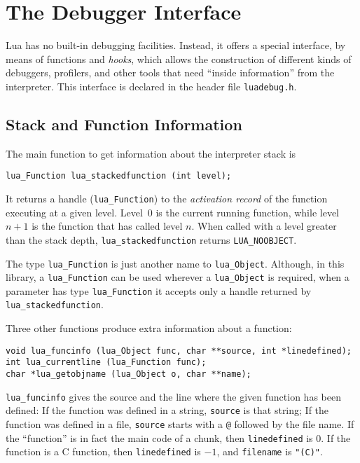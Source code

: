 \documentclass[11pt]{article}
\newcommand{\Math}[1]{$#1$}
\begin{document}
\section{The Debugger Interface} \label{debugI}

Lua has no built-in debugging facilities.
Instead, it offers a special interface,
by means of functions and \emph{hooks},
which allows the construction of different
kinds of debuggers, profilers, and other tools
that need ``inside information'' from the interpreter.
This interface is declared in the header file \verb|luadebug.h|.

\subsection{Stack and Function Information}

The main function to get information about the interpreter stack
is
\begin{verbatim}
lua_Function lua_stackedfunction (int level);
\end{verbatim}
It returns a handle (\verb|lua_Function|) to the \emph{activation record}
of the function executing at a given level.
Level~0 is the current running function,
while level \Math{n+1} is the function that has called level \Math{n}.
When called with a level greater than the stack depth,
\verb|lua_stackedfunction| returns \verb|LUA_NOOBJECT|.

The type \verb|lua_Function| is just another name
to \verb|lua_Object|.
Although, in this library,
a \verb|lua_Function| can be used wherever a \verb|lua_Object| is required,
when a parameter has type \verb|lua_Function|
it accepts only a handle returned by
\verb|lua_stackedfunction|.

Three other functions produce extra information about a function:
\begin{verbatim}
void lua_funcinfo (lua_Object func, char **source, int *linedefined);
int lua_currentline (lua_Function func);
char *lua_getobjname (lua_Object o, char **name);
\end{verbatim}
\verb|lua_funcinfo| gives the source and the line where the
given function has been defined:
If the function was defined in a string,
\verb|source| is that string;
If the function was defined in a file,
\verb|source| starts with a \verb|@| followed by the file name.
If the ``function'' is in fact the main code of a chunk,
then \verb|linedefined| is 0.
If the function is a C function,
then \verb|linedefined| is \Math{-1}, and \verb|filename| is \verb|"(C)"|.
\end{document}
